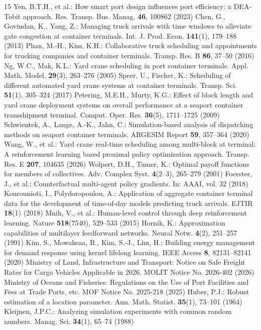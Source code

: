\documentclass{llncs}
\begin{document}
\small
\begin{thebibliography}{15}
\setlength{\itemsep}{0pt}
\setlength{\parsep}{0pt}
\setlength{\topsep}{2pt}
 Yen, B.T.H., et al.: How smart port design influences port efficiency: a DEA-Tobit approach. Res. Transp. Bus. Manag. \textbf{46}, 100862 (2023)
 Chen, G., Govindan, K., Yang, Z.: Managing truck arrivals with time windows to alleviate gate congestion at container terminals. Int. J. Prod. Econ. \textbf{141}(1), 179--188 (2013)
 Phan, M.-H., Kim, K.H.: Collaborative truck scheduling and appointments for trucking companies and container terminals. Transp. Res. B \textbf{86}, 37--50 (2016)
 Ng, W.C., Mak, K.L.: Yard crane scheduling in port container terminals. Appl. Math. Model. \textbf{29}(3), 263--276 (2005)
 Speer, U., Fischer, K.: Scheduling of different automated yard crane systems at container terminals. Transp. Sci. \textbf{51}(1), 305--324 (2017)
 Petering, M.E.H., Murty, K.G.: Effect of block length and yard crane deployment systems on overall performance at a seaport container transshipment terminal. Comput. Oper. Res. \textbf{36}(5), 1711--1725 (2009)
 Schwientek, A., Lange, A.-K., Jahn, C.: Simulation-based analysis of dispatching methods on seaport container terminals. ARGESIM Report \textbf{59}, 357--364 (2020)
 Wang, W., et al.: Yard crane real-time scheduling among multi-block at terminal: A reinforcement learning based proximal policy optimization approach. Transp. Res. E \textbf{207}, 104635 (2026)
 Wolpert, D.H., Tumer, K.: Optimal payoff functions for members of collectives. Adv. Complex Syst. \textbf{4}(2--3), 265--279 (2001)
 Foerster, J., et al.: Counterfactual multi-agent policy gradients. In: AAAI, vol. 32 (2018)
 Kourounioti, I., Polydoropoulou, A.: Application of aggregate container terminal data for the development of time-of-day models predicting truck arrivals. EJTIR \textbf{18}(1) (2018)
 Mnih, V., et al.: Human-level control through deep reinforcement learning. Nature \textbf{518}(7540), 529--533 (2015)
 Hornik, K.: Approximation capabilities of multilayer feedforward networks. Neural Netw. \textbf{4}(2), 251--257 (1991)
 Kim, S., Mowakeaa, R., Kim, S.-J., Lim, H.: Building energy management for demand response using kernel lifelong learning. IEEE Access \textbf{8}, 82131--82141 (2020)
 Ministry of Land, Infrastructure and Transport: Notice on Safe Freight Rates for Cargo Vehicles Applicable in 2026. MOLIT Notice No. 2026-402 (2026)
 Ministry of Oceans and Fisheries: Regulations on the Use of Port Facilities and Fees at Trade Ports, etc. MOF Notice No. 2025-218 (2025)
 Huber, P.J.: Robust estimation of a location parameter. Ann. Math. Statist. \textbf{35}(1), 73--101 (1964)
 Kleijnen, J.P.C.: Analyzing simulation experiments with common random numbers. Manag. Sci. \textbf{34}(1), 65--74 (1988)
\end{thebibliography}
\end{document}
